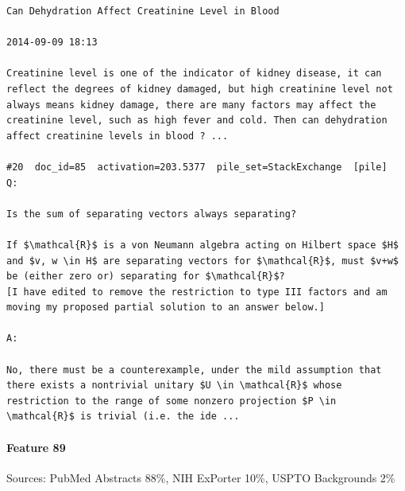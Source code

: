 \begin{verbatim}
Can Dehydration Affect Creatinine Level in Blood

2014-09-09 18:13

Creatinine level is one of the indicator of kidney disease, it can reflect the degrees of kidney damaged, but high creatinine level not always means kidney damage, there are many factors may affect the creatinine level, such as high fever and cold. Then can dehydration affect creatinine levels in blood ? ...

#20  doc_id=85  activation=203.5377  pile_set=StackExchange  [pile]
Q:

Is the sum of separating vectors always separating?

If $\mathcal{R}$ is a von Neumann algebra acting on Hilbert space $H$ and $v, w \in H$ are separating vectors for $\mathcal{R}$, must $v+w$ be (either zero or) separating for $\mathcal{R}$?
[I have edited to remove the restriction to type III factors and am moving my proposed partial solution to an answer below.]

A:

No, there must be a counterexample, under the mild assumption that there exists a nontrivial unitary $U \in \mathcal{R}$ whose restriction to the range of some nonzero projection $P \in \mathcal{R}$ is trivial (i.e. the ide ...

\end{verbatim}

\paragraph*{Feature 89} Sources: PubMed Abstracts 88\%, NIH ExPorter 10\%, USPTO Backgrounds 2\%

